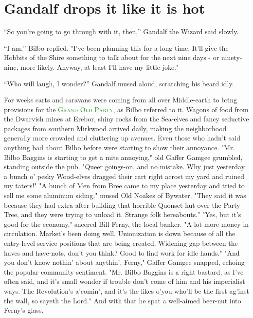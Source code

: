 \chapter[Hobbit Party]{Gandalf drops it like it is hot}

 ``So you're going to go through with it, then,'' Gandalf the Wizard said 
slowly.

     ``I am,'' Bilbo replied. "I've been planning this for a long time. 
It'll give the Hobbits of the Shire something to talk about for the next 
nine days - or ninety-nine, more likely. Anyway, at least I'll have my 
little joke."

     ``Who will laugh, I wonder?'' Gandalf mused aloud, scratching his 
beard idly.


     For weeks carts and caravans were coming from all over Middle-earth 
to bring provisions for the \textcolor{ForestGreen}{\textsc{\LARGE Grand Old Party}}, as Bilbo referred to it. 
Wagons of food from the Dwarvish mines at Erebor, shiny rocks from the 
Sea-elves and fancy seductive packages from southern Mirkwood arrived 
daily, making the neighborhood generally more crowded and cluttering up 
avenues. Even those who hadn't said anything bad about Bilbo before were 
starting to show their annoyance. "Mr. Bilbo Baggins is starting to get a 
mite annoying," old Gaffer Gamgee grumbled, standing outside the pub. 
"Queer goings-on, and no mistake. Why just yesterday a bunch o' pesky 
Wood-elves dragged their cart right acrost my yard and ruined my taters!"
     "A bunch of Men from Bree came to my place yesterday and tried to 
sell me some aluminum siding," mused Old Noakes of Bywater. "They said it 
was because they had extra after building that horrible Quonset hut over 
the Party Tree, and they were trying to unload it. Strange folk 
hereabouts."
     "Yes, but it's good for the economy," sneered Bill Ferny, the local 
banker. "A lot more money in circulation. Market's been doing well. 
Unionization is down because of all the entry-level service positions 
that are being created. Widening gap between the haves and have-nots, 
don't you think? Good to find work for idle hands."
     "And you don't know nothin' about anythin', Ferny," Gaffer Gamgee 
snapped, echoing the popular community sentiment. "Mr. Bilbo Baggins is a 
right bastard, as I've often said, and it's small wonder if trouble don't 
come of him and his imperialist ways. The Revolution's a'comin', and it's 
the likes o'you who'll be the first ag'inst the wall, so sayeth the 
Lord." And with that he spat a well-aimed beer-nut into Ferny's glass.

